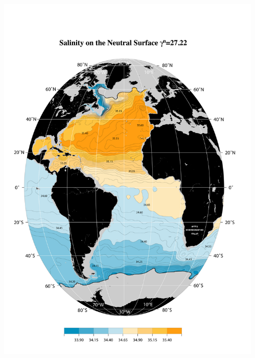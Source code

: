\documentclass{beamer}
\begin{document}
\begin{frame}[plain,t]

    \begin{columns}
      \begin{column}{0.5\textwidth}
          \includegraphics[width=\textwidth]{salnty_isopyc_jpg/gam2722_sal.jpg}
       \end{column}
      \begin{column}{0.5\textwidth}

\end{column}
\end{columns}
\end{frame}
\end{document}
